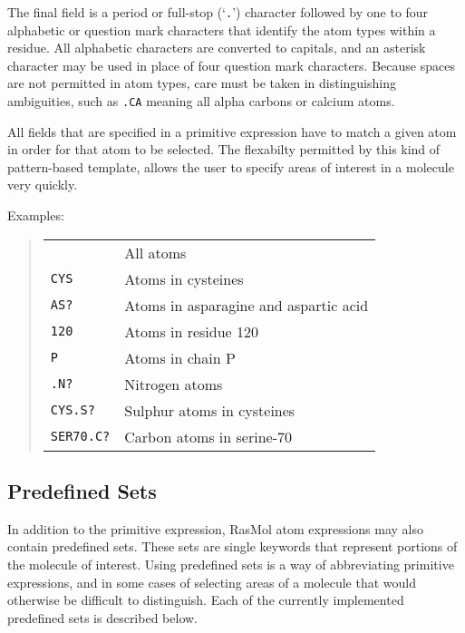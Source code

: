 The final field is a period or full-stop (`{\tt .}') character followed by
one to four alphabetic or question mark characters that identify the atom
types within a residue. All alphabetic characters are converted to capitals,
and an asterisk character may be used in place of four question mark 
characters. Because spaces are not permitted in atom types, care must be 
taken in distinguishing ambiguities, such as {\tt *.CA} meaning all alpha 
carbons or calcium atoms.


All fields that are specified in a primitive expression have to match
a given atom in order for that atom to be selected. The flexabilty permitted
by this kind of pattern-based template, allows the user to specify areas 
of interest in a molecule very quickly.

Examples:
\begin{quote}\begin{tabular}{ll}
 {\tt *}        & All atoms                             \\
 {\tt CYS}      & Atoms in cysteines                    \\
 {\tt AS?}      & Atoms in asparagine and aspartic acid \\
 {\tt *120}     & Atoms in residue 120                  \\
 {\tt *P}       & Atoms in chain P                      \\
 {\tt *.N? }    & Nitrogen atoms                        \\
 {\tt CYS.S?}   & Sulphur atoms in cysteines            \\
 {\tt SER70.C?} & Carbon atoms in serine-70 
\end{tabular}\end{quote}


\subsection{Predefined Sets}
\label{Sets}
In addition to the primitive expression, RasMol atom expressions may also
contain predefined sets. These sets are single keywords that represent
portions of the molecule of interest. Using predefined sets is a way of
abbreviating primitive expressions, and in some cases of selecting areas
of a molecule that would otherwise be difficult to distinguish. Each of
the currently implemented predefined sets is described below.


